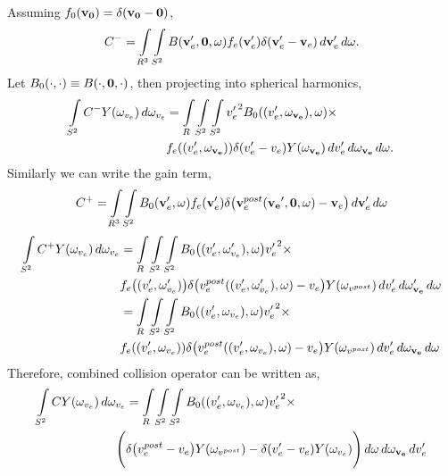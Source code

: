 \documentclass{article}[draft]
\begin{document}
Assuming $f_0\of{\vect{v_0}}=\delta(\vect{v_0}-\vect{0})$, 
\begin{align*}
C^- = \myint_{R^3} \myint_{S^2}  
B\of{\vect{v}_e^\prime, \vect{0}, \vect{\omega}} 
f_e\of{\vect{v}_e^\prime} \delta\of{\vect{v}_e^\prime - \vect{v}_e} 
\diff{\vect{v}_e^\prime} \diff{\vect{\omega}}. \\
\end{align*} Let $B_0(\cdot,\cdot) \equiv B(\cdot,\mathbf{0},\cdot)$, then projecting into spherical harmonics, 
\begin{align*}
\myint_{S^2} C^- Y(\omega_{v_e}) \diff{\omega_{v_e}}& = 
\myint_{R} \myint_{S^2} \myint_{S^2} 
{v_e^\prime}^2 B_0\of{(v_e^\prime,\vect{\omega_{v_e}}), \vect{\omega}} \times \\
&f_e\of{(v_e^\prime,\vect{\omega_{v_e}})} \delta\of{v_e^\prime - v_e} Y\of{\vect{\omega_{v_e}}} 
\diff{v_e^\prime} \diff{\vect{\omega_{v_e}}} \diff{\vect{\omega}}. \\
\end{align*} Similarly we can write the gain term, 
\begin{align*}
C^+ = \myint_{R^3} \myint_{S^2}  
B_0\of{\vect{v}_e^\prime, \vect{\omega}} 
f_e\of{\vect{v}_e^\prime} \delta\of{\vect{v}_e^{post}(\vect{v_e}^\prime,\vect{0},\omega)- \vect{v}_e} 
\diff{\vect{v}_e^\prime} \diff{\vect{\omega}} 
\end{align*}
\begin{align*}
\myint_{S^2} C^+ Y(\omega_{v_e}) \diff{\omega_{v_e}}& = \myint_{R} \myint_{S^2} \myint_{S^2}
B_0\of{(v_e^\prime,\omega_{v_e}^\prime), \vect{\omega}} {v_e^\prime}^2 \times \\
&f_e\of{(v_e^\prime,\omega_{v_e}^\prime)} \delta\of{v_e^{post}((v_e^\prime,\omega_{v_e}^\prime),\omega)- {v}_e} Y\of{\omega_{v^{post}}} \diff{v_e^\prime} \diff{\vect{\omega_{v_e}^\prime}} \diff{\vect{\omega}}\\
&=\myint_{R} \myint_{S^2} \myint_{S^2}
B_0\of{(v_e^\prime,\omega_{v_e}), \vect{\omega}} {v_e^\prime}^2 \times \\
&f_e\of{(v_e^\prime,\omega_{v_e})} \delta\of{v_e^{post}((v_e^\prime,\omega_{v_e}),\omega)- {v}_e} Y\of{\omega_{v^{post}}} \diff{v_e^\prime} \diff{\vect{\omega_{v_e}}} \diff{\vect{\omega}}
\end{align*} Therefore, combined collision operator can be written as, 
\begin{align*}
\myint_{S^2} C Y\of{\omega_{v_e}} \diff{\omega_{v_e}}& = 
\myint_{R} \myint_{S^2} \myint_{S^2} 
B_0\of{(v_e^\prime,\omega_{v_e}), \vect{\omega}} {v_e^\prime}^2 \times \\
\Bigg(
&\delta\of{v_e^{post}- {v}_e} Y\of{\omega_{v^{post}}} - \delta\of{v_e^\prime - v_e} Y\of{\omega_{v_e}}
\Bigg)
\diff{\vect{\omega}} \diff{\vect{\omega_{v_e}}} \diff{v_e^\prime} 
\end{align*}
\end{document}
